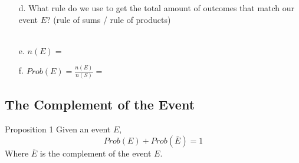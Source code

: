 {\begin{questionNOGRADE}{\thequestion}
\begin{enumerate}
                \item[d.]   What rule do we use to get the total amount of outcomes that match our event $E$? 
                            \footnotesize
                            (rule of sums / rule of products)
                            \normalsize ~\\~\\

                \item[e.]   $n(E) = $ \vspace{1cm}

                \item[f.]   $Prob(E) = \frac{n(E)}{n(S)} = $
            \end{enumerate}
        \end{questionNOGRADE}

    \subsection{The Complement of the Event}
        \begin{intro}{Proposition 1}
            Given an event $E$,
            $$ Prob(E) + Prob(\bar{E}) = 1 $$
            Where $\bar{E}$ is the complement of the event $E$.
        \end{intro}
        




}
